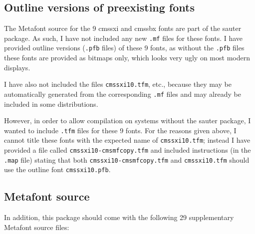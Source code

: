 \documentclass{amsart}
\begin{document}
\subsection{Outline versions of preexisting fonts}
The Metafont source for the 9 \textsf{cmssxi} and \textsf{cmssbx} fonts are part of the \textsf{sauter} package. As such, I have not included any new \texttt{.mf} files for these fonts. I have provided outline versions (\texttt{.pfb} files) of these 9 fonts, as without the \texttt{.pfb} files these fonts are provided as bitmaps only, which looks very ugly on most modern displays.

I have also not included the files \texttt{cmssxi10.tfm}, etc., because they may be automatically generated from the corresponding \texttt{.mf} files and may already be included in some distributions.

However, in order to allow compilation on systems without the \textsf{sauter} package, I wanted to include \texttt{.tfm} files for these 9 fonts. For the reasons given above, I cannot title these fonts with the expected name of \texttt{cmssxi10.tfm}; instead I have provided a file called \texttt{cmssxi10-cmsmfcopy.tfm} and included instructions (in the \texttt{.map} file) stating that both \texttt{cmssxi10-cmsmfcopy.tfm} and \texttt{cmssxi10.tfm} should use the outline font \texttt{cmssxi10.pfb}.

\subsection{Metafont source}
In addition, this package should come with the following 29 supplementary Metafont source files:
\end{document}
